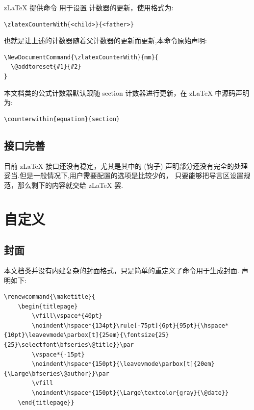 z\LaTeX{} 提供命令\cmd{\zlatexCounterWith}\index{\cmd{\zlatexCounterWith}} 用于设置
计数器的更新，使用格式为:
\begin{verbatim}
\zlatexCounterWith{<child>}{<father>}
\end{verbatim}

也就是让上述的计数器随着父计数器的更新而更新,本命令原始声明:
\begin{verbatim}
\NewDocumentCommand{\zlatexCounterWith}{mm}{
  \@addtoreset{#1}{#2}
}
\end{verbatim}

本文档类的公式计数器默认跟随 {section} 计数器进行更新，在 z\LaTeX{} 中源码声明为:
\begin{verbatim}
\counterwithin{equation}{section}
\end{verbatim}

\subsection{接口完善}
目前 z\LaTeX{} 接口还没有稳定，尤其是其中的 (钩子) 声明部分还没有完全的处理妥当.但是一般情况下,用户需要配置的选项是比较少的，
只要能够把导言区设置规范，那么剩下的内容就交给 z\LaTeX{} 罢.


\section{自定义}
\subsection{封面}
本文档类并没有内建复杂的封面格式，只是简单的重定义了\cmd{\maketitle}命令用于生成封面. 
声明如下:
\begin{verbatim}
\renewcommand{\maketitle}{
    \begin{titlepage}
        \vfill\vspace*{40pt}
        \noindent\hspace*{134pt}\rule[-75pt]{6pt}{95pt}{\hspace*{10pt}\leavevmode\parbox[t]{25em}{\fontsize{25}{25}\selectfont\bfseries\@title}}\par
        \vspace*{-15pt}
        \noindent\hspace*{150pt}{\leavevmode\parbox[t]{20em}{\Large\bfseries\@author}}\par
        \vfill
        \noindent\hspace*{150pt}{\Large\textcolor{gray}{\@date}}
    \end{titlepage}} 
\end{verbatim}

